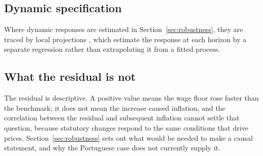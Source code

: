 \subsection{Dynamic specification}

Where dynamic responses are estimated in Section~\ref{sec:robustness}, they are
traced by local projections \citep{jorda2005projections}, which estimate the
response at each horizon by a separate regression rather than extrapolating it
from a fitted process.

\subsection{What the residual is not}

The residual is descriptive. A positive value means the wage floor rose faster
than the benchmark; it does not mean the increase caused inflation, and the
correlation between the residual and subsequent inflation cannot settle that
question, because statutory changes respond to the same conditions that drive
prices. Section~\ref{sec:robustness} sets out what would be needed to make a
causal statement, and why the Portuguese case does not currently supply it.
